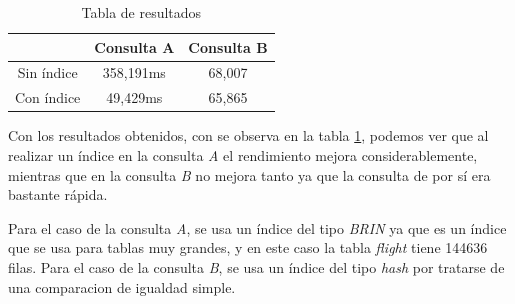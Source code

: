 \documentclass[11pt]{report}
\begin{document}
\cleardoublepage

\begin{table}[H]
  \centering
  \begin{tabular}{|c|c|c|}
    \hline
    \textbf{}  & \textbf{Consulta A} & \textbf{Consulta B} \\ \hline
    Sin índice & 358,191ms & 68,007 \\ \hline
    Con índice & 49,429ms & 65,865 \\ \hline
  \end{tabular}
  \caption{Tabla de resultados}
  \label{tab:tabla de resultados}
\end{table}

Con los resultados obtenidos, con se observa en la tabla \ref{tab:tabla de resultados},
podemos ver que al realizar un índice en la consulta \emph{A} el rendimiento
mejora considerablemente, mientras que en la consulta \emph{B} no mejora tanto ya que la consulta de por sí
era bastante rápida.

Para el caso de la consulta \emph{A}, se usa un índice del tipo \emph{BRIN} ya que es un índice que se usa
para tablas muy grandes, y en este caso la tabla \emph{flight} tiene 144636 filas. Para el caso de la consulta
\emph{B}, se usa un índice del tipo \emph{hash} por tratarse de una comparacion de igualdad simple.
\end{document}

